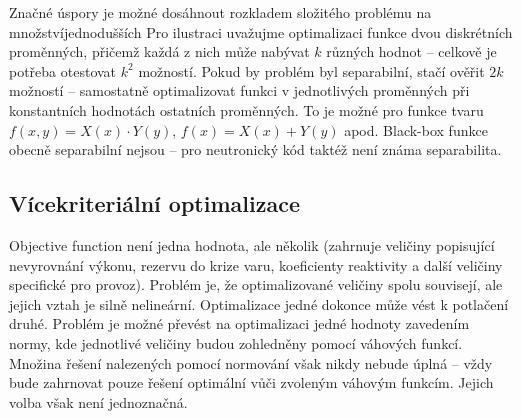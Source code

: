 Značné úspory je možné dosáhnout rozkladem složitého problému na množství\newline jednodušších Pro ilustraci uvažujme optimalizaci funkce dvou diskrétních proměnných, 
přičemž každá z nich může nabývat $k$ různých hodnot -- celkově je potřeba otestovat $k^2$ možností. Pokud by problém byl separabilní, 
stačí ověřit $2k$ možností -- samostatně optimalizovat funkci v jednotlivých proměnných při konstantních hodnotách ostatních proměnných. To je 
možné pro funkce tvaru 
$f(x,y) = X(x)\cdot Y(y)$, $f(x) = X(x) + Y(y)$ apod. Black-box funkce obecně separabilní nejsou -- pro neutronický kód taktéž 
není známa separabilita.




\subsection{Vícekriteriální optimalizace}
\label{ch:vicekrit}
Objective function není jedna hodnota, ale několik (zahrnuje veličiny popisující nevyrovnání výkonu, rezervu do krize varu, koeficienty reaktivity 
a další veličiny specifické pro provoz). 
Problém je, že optimalizované veličiny spolu souvisejí, ale jejich vztah je silně nelineární. Optimalizace jedné dokonce může 
vést k potlačení druhé. Problém je možné převést 
na optimalizaci jedné hodnoty zavedením 
normy, kde jednotlivé veličiny budou zohledněny pomocí váhových funkcí. Množina řešení nalezených pomocí normování však nikdy nebude úplná -- vždy 
bude zahrnovat pouze řešení optimální vůči zvoleným váhovým funkcím. Jejich volba však není jednoznačná. 


